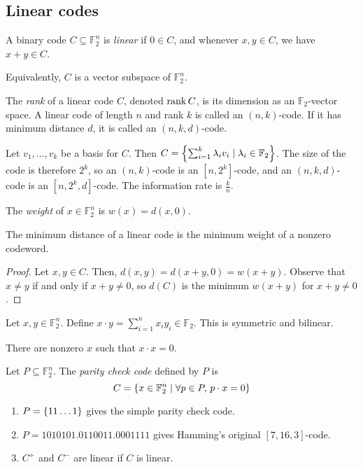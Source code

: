 \subsection{Linear codes}
\begin{definition}
    A binary code \( C \subseteq \mathbb F_2^n \) is \emph{linear} if \( 0 \in C \), and whenever \( x, y \in C \), we have \( x + y \in C \).
\end{definition}
Equivalently, \( C \) is a vector subspace of \( \mathbb F_2^n \).
\begin{definition}
    The \emph{rank} of a linear code \( C \), denoted \( \rank C \), is its dimension as an \( \mathbb F_2 \)-vector space.
    A linear code of length \( n \) and rank \( k \) is called an \( (n,k) \)-code.
    If it has minimum distance \( d \), it is called an \( (n,k,d) \)-code.
\end{definition}
Let \( v_1, \dots, v_k \) be a basis for \( C \).
Then \( C = \qty{\sum_{i=1}^k \lambda_i v_i \mid \lambda_i \in \mathbb F_2} \).
The size of the code is therefore \( 2^k \), so an \( (n,k) \)-code is an \( [n,2^k] \)-code, and an \( (n,k,d) \)-code is an \( [n,2^k,d] \)-code.
The information rate is \( \frac{k}{n} \).
\begin{definition}
    The \emph{weight} of \( x \in \mathbb F_2^n \) is \( w(x) = d(x,0) \).
\end{definition}
\begin{lemma}
    The minimum distance of a linear code is the minimum weight of a nonzero codeword.
\end{lemma}
\begin{proof}
    Let \( x, y \in C \).
    Then, \( d(x,y) = d(x+y,0) = w(x+y) \).
    Observe that \( x \neq y \) if and only if \( x + y \neq 0 \), so \( d(C) \) is the minimum \( w(x+y) \) for \( x + y \neq 0 \). 
\end{proof}
\begin{definition}
    Let \( x, y \in \mathbb F_2^n \).
    Define \( x \cdot y = \sum_{i=1}^n x_i y_i \in \mathbb F_2 \).
    This is symmetric and bilinear.
\end{definition}
There are nonzero \( x \) such that \( x \cdot x = 0 \).
\begin{definition}
    Let \( P \subseteq \mathbb F_2^n \).
    The \emph{parity check code} defined by \( P \) is
    \[ C = \qty{x \in \mathbb F_2^n \mid \forall p \in P,\,p \cdot x = 0} \]
\end{definition}
\begin{example}
    \begin{enumerate}
        \item \( P = \qty{11\dots 1} \) gives the simple parity check code.
        \item \( P = \qty{1010101, 0110011, 0001111} \) gives Hamming's original \( [7,16,3] \)-code.
        \item \( C^+ \) and \( C^- \) are linear if \( C \) is linear.
    \end{enumerate}
\end{example}
